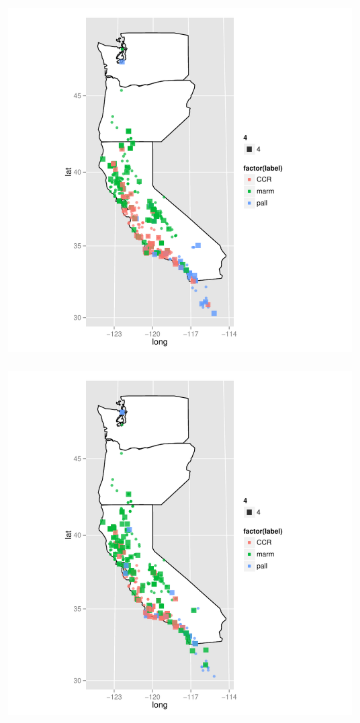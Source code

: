 \documentclass{article}\usepackage{graphicx, color}
\begin{document}
\begin{figure}[t]
  \centering
  \begin{subfigure}[b]{0.5\textwidth}
    \centering
    \caption{}
    \includegraphics[width = \textwidth]{figure/nnet-map1}
    \label{fig:nnet-map1}
  \end{subfigure}%
  \begin{subfigure}[b]{0.5\textwidth}
    \centering
    \caption{}
    \includegraphics[width = \textwidth]{figure/nnet-map2}
    \label{fig:nnet-map2}
  \end{subfigure}\\


\end{figure}
\end{document}
